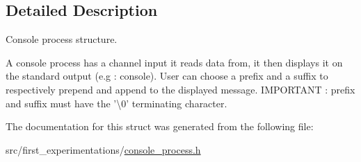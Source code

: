 \subsection{Detailed Description}
Console process structure. 

A console process has a channel input it reads data from, it then displays it on the standard output (e.\-g \-: console). User can choose a prefix and a suffix to respectively prepend and append to the displayed message. I\-M\-P\-O\-R\-T\-A\-N\-T \-: prefix and suffix must have the '\textbackslash{}0' terminating character. 

The documentation for this struct was generated from the following file\-:\begin{DoxyCompactItemize}
\item 
src/first\-\_\-experimentations/\hyperlink{console__process_8h}{console\-\_\-process.\-h}\end{DoxyCompactItemize}

